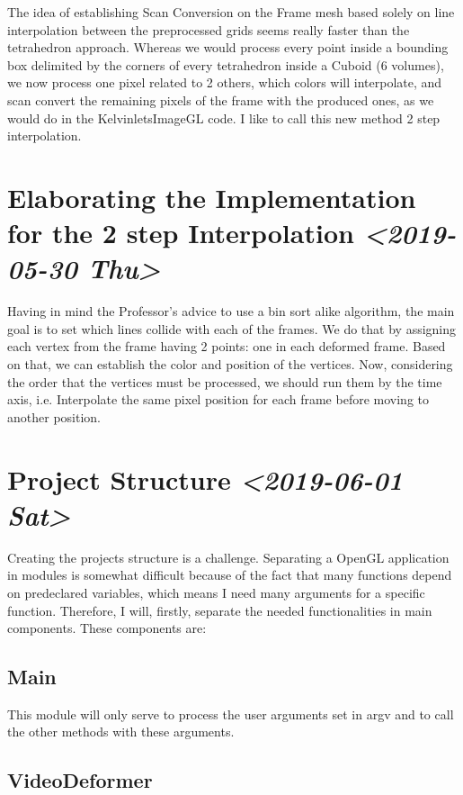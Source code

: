 \documentclass[11pt]{article}
\begin{document}
  The idea of establishing Scan Conversion on the Frame mesh based solely on line interpolation between the preprocessed grids seems really faster than the tetrahedron approach. Whereas we would process every point inside a bounding box delimited by the corners of every tetrahedron inside a Cuboid (6 volumes), we now process one pixel related to 2 others, which colors will
interpolate, and scan convert the remaining pixels of the frame with the produced ones, as we would do in the KelvinletsImageGL code. I like to call this new method 2 step interpolation.

\section*{Elaborating the Implementation for the 2 step Interpolation \textit{<2019-05-30 Thu>}}
\label{sec:org4147f4b}

Having in mind the Professor’s advice to use a bin sort alike algorithm, the main goal is to set which lines collide with each of the frames. We do that by assigning each vertex from the frame having 2 points: one in each deformed frame. Based on that, we can establish the color and position of the vertices. Now, considering the order that the vertices must be processed, we should run them by the time axis, i.e. Interpolate the same pixel position for each frame before moving to another position.

\section*{Project Structure \textit{<2019-06-01 Sat>}}
\label{sec:org33fa871}

Creating the projects structure is a challenge. Separating a OpenGL application in modules is somewhat difficult because of the fact that many functions depend on predeclared variables, which means I need many arguments for a specific function. Therefore, I will, firstly, separate the needed functionalities in main components. These components are:

\subsection*{Main}
\label{sec:orge447504}

This module will only serve to process the user arguments set in argv and to call the other methods with these arguments.

\subsection*{VideoDeformer}
\label{sec:org4fbd4ed}
\end{document}
